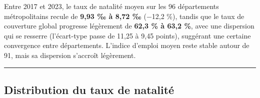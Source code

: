 \documentclass[
  letterpaper,
  DIV=11,
  numbers=noendperiod]{scrartcl}
\begin{document}
Entre 2017 et 2023, le taux de natalité moyen sur les 96 départements
métropolitains recule de \textbf{9,93 ‰ à 8,72 ‰} (−12,2 \%), tandis que
le taux de couverture global progresse légèrement de \textbf{62,3 \% à
63,2 \%}, avec une dispersion qui se resserre (l'écart-type passe de
11,25 à 9,45 points), suggérant une certaine convergence entre
départements. L'indice d'emploi moyen reste stable autour de 91, mais sa
dispersion s'accroît légèrement.

\begin{center}\rule{0.5\linewidth}{0.5pt}\end{center}

\subsection{Distribution du taux de
natalité}\label{distribution-du-taux-de-natalituxe9}
\end{document}
